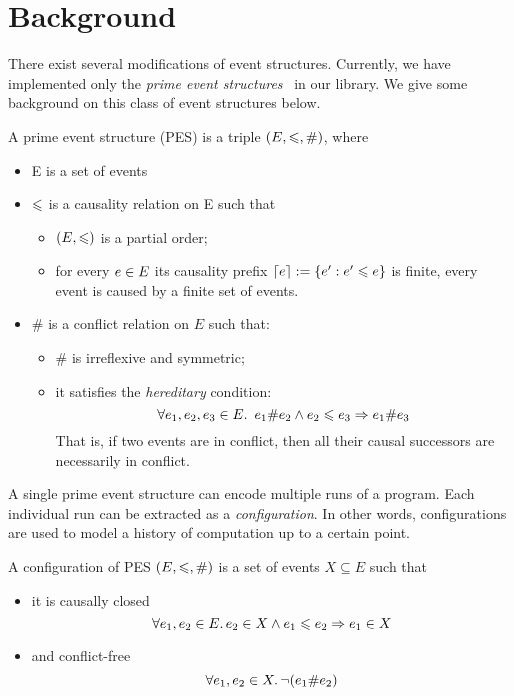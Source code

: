 \section{Background}

There exist several modifications of event structures.
Currently, we have implemented only 
the \emph{prime event structures}~\cite{Winskel:86} in our library. 
We give some background on this class of event structures below.

\begin{definition} 
\label{es_def}
A prime event structure (PES) is a triple $(E, \leqslant, \#)$, where
\begin{itemize}
  \item E is a set of events
  \item $\leqslant$ is a causality relation on E such that 
  \begin{itemize}
    \item $ (E, \leqslant) $ is a partial order;
    \item for every $e \in E$ its causality prefix ${\lceil e \rceil := \{ e' : e' \leqslant e \}}$ 
      is finite, \ie every event is caused by a finite set of events.
  \end{itemize}
  \item $\#$ is a conflict relation on $E$ such that:
  \begin{itemize}
    \item $\#$ is irreflexive and symmetric;
    \item it satisfies the \emph{hereditary} condition:
    $$ \forall e_1, e_2, e_3 \in E \ldotp \ e_1 \# e_2 \land e_2 \leqslant e_3 \Rightarrow e_1 \# e_3 $$
      That is, if two events are in conflict, then all their causal successors 
      are necessarily in conflict.
  \end{itemize}
\end{itemize}
\end{definition}

A single prime event structure can encode multiple runs of a program.
Each individual run can be extracted as a \emph{configuration}. 
In other words, configurations are used to model 
a history of computation up to a certain point.

\begin{definition}
A configuration of PES $(E, \leqslant, \#)$ is a set of events $X \subseteq E$ such that
\begin{itemize}
  \item it is causally closed 
    $$ \forall e_1, e_2 \in E \ldotp e_2 \in X \land e_1 \leqslant e_2 \Rightarrow e_1 \in X $$
  \item and conflict-free 
    $$ \forall e_1, e_2 \in X \ldotp \neg (e_1 \# e_2) $$
\end{itemize}
\end{definition}

